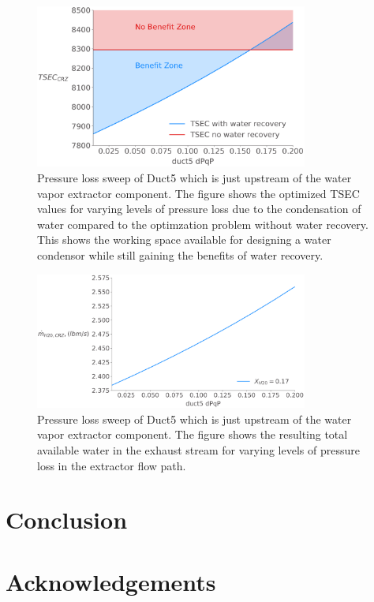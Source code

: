 \documentclass[conf]{new-aiaa}
\begin{document}
\begin{figure}[hbt!]
    \centering
    \includegraphics[width=0.8\textwidth]{N3_dpqp.pdf}
    \caption{Pressure loss sweep of Duct5 which is just upstream of the water vapor extractor component.
        The figure shows the optimized TSEC values for varying levels of pressure loss due to the condensation of water compared to the optimzation problem without water recovery.
        This shows the working space available for designing a water condensor while still gaining the benefits of water recovery.}
    \label{fig:dpqp_sweep}
\end{figure}

\begin{figure}[hbt!]
    \centering
    \includegraphics[width=0.8\textwidth]{N3_wdot.pdf}
    \caption{Pressure loss sweep of Duct5 which is just upstream of the water vapor extractor component.
        The figure shows the resulting total available water in the exhaust stream for varying levels of pressure loss in the extractor flow path.
    }
    \label{fig:dpqp_wdot}
\end{figure}

\section{Conclusion}
\label{sec:conc}

\section{Acknowledgements}


\end{document}
